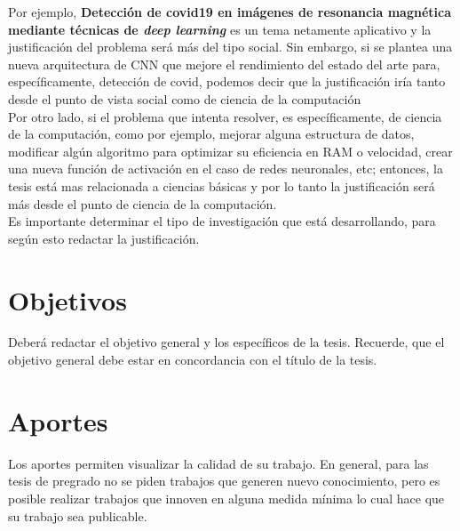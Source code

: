 Por ejemplo, \textbf{Detección de covid19 en imágenes de resonancia magnética   mediante técnicas de \textit{deep learning}} es un tema netamente aplicativo y la justificación del problema será  más del tipo social. Sin embargo, si se plantea una nueva arquitectura de CNN que mejore el rendimiento del estado del arte para, específicamente, detección de covid, podemos decir que la justificación iría tanto desde el punto de vista social como de ciencia de la computación \\


Por otro lado, si el problema que intenta resolver, es específicamente, de ciencia de la computación, como por ejemplo, mejorar alguna estructura de datos, modificar algún algoritmo para optimizar su eficiencia en RAM o velocidad, crear una nueva función de activación en el caso de redes neuronales, etc; entonces, la tesis está mas relacionada a ciencias básicas y por lo tanto la justificación será más desde el punto de ciencia de la computación.  \\

Es importante determinar el tipo de investigación que está desarrollando, para según esto redactar la justificación.

\section{Objetivos}
Deberá redactar el objetivo general y los específicos de la tesis. Recuerde, que el objetivo general debe estar en concordancia con el título de la tesis.


\section{Aportes}
Los aportes permiten visualizar la calidad de su trabajo. En general, para las tesis de pregrado no se piden trabajos que generen nuevo conocimiento, pero es posible realizar trabajos que innoven en alguna medida  mínima lo cual hace que su trabajo sea publicable.


